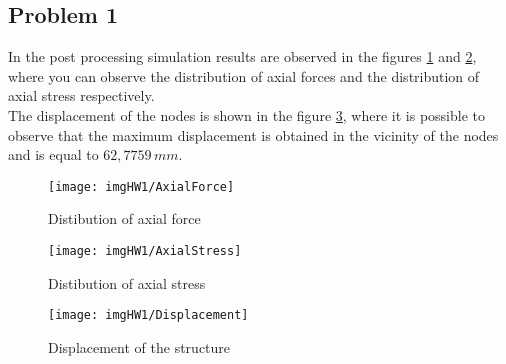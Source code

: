 \subsection{Problem 1}
In the post processing simulation results are observed in the figures \ref{img:HW1-AxialForce} and \ref{img:HW1-AxialStress}, where you can observe the distribution of axial forces and the distribution of axial stress respectively.\\
The displacement of the nodes is shown in the figure \ref{img:HW1-Displacement}, where it is possible to observe that the maximum displacement is obtained in the vicinity of the nodes and is equal to $62,7759 \, mm$.
\begin{figure}[!h]
\centering %
\texttt{[image: imgHW1/AxialForce]}
\caption{Distibution of axial force}
\label{img:HW1-AxialForce}
\end{figure}
\begin{figure}[!h]
\centering %
\texttt{[image: imgHW1/AxialStress]}
\caption{Distibution of axial stress}
\label{img:HW1-AxialStress}
\end{figure}
\begin{figure}[!h]
\centering %
\texttt{[image: imgHW1/Displacement]}
\caption{Displacement of the structure}
\label{img:HW1-Displacement}
\end{figure}\pagebreak\\
